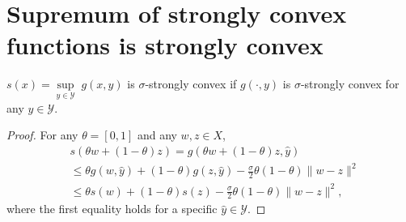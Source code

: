 \documentclass[pmlr]{jmlr} %
\def\reals{\mathbb{R}}
\def\reals{\mathbb{R}}
\def\K{\mathcal{K}}
\def\argmax{\mathop{\arg\max}}
\newcommand{\norm}[1]{\left\lVert#1\right\rVert}
\newcommand{\YY}{\mathcal{Y}}
\begin{document}
\section{Supremum of strongly convex functions is strongly convex}

\begin{lemma} \label{mysc}
$s(x) = \underset{y \in \YY}{\sup}\; g(x,y)$ is $\sigma$-strongly convex if $g(\cdot,y)$ is $\sigma$-strongly convex for any $y \in \YY$.
\end{lemma}

\begin{proof}
For any $\theta=[0,1]$ and any $w,z \in X$,
\begin{equation}
\begin{aligned}
& s(\theta w + (1-\theta) z ) = g( \theta w + (1-\theta) z , \hat{y} )
\\ &\leq \theta g(w, \hat{y}) +  (1-\theta) g(z, \hat{y}) - \frac{\sigma}{2} \theta (1 -\theta) \| w -z \|^{2}
\\ &\leq \theta s(w) + (1-\theta) s(z) - \frac{\sigma}{2} \theta (1 -\theta) \| w -z \|^{2},
\end{aligned}
\end{equation}
where the first equality holds for a specific $\hat{y} \in \YY$.

\end{proof}


\begin{comment}

\section{Another definition of strongly convex sets} \label{app:scset}

    It is shown in Proposition A.1 of~(\cite{HLGS16}) that an $\lambda$-strongly convex set
    can be expressed as the intersection of infinitely many Euclidean balls.  Denote that
    the $d$ dimensional unit sphere
    ${\mathcal{S} = \left\{ u \in \reals^{d} : \norm{u}^{2} = 1 \right\}}$
    and write $x_{u} = \underset{x \in \K}{\argmax} \left\langle x, u \right\rangle$
    for some $u \in \mathcal{S}$. A $\lambda$-strongly convex set $\K$ can be written as
    \[ \K = \underset{u \in \mathcal{S}}{\cap} B_{\frac{1}{\lambda}} \left( x_{u} - \frac{u}{\lambda} \right) ,\]
    where $B_{\frac{1}{\lambda}} \left( x_{u} - \frac{u}{\lambda} \right)$ represents
    a ball centered at $x_{u} - \frac{u}{\lambda}$ with radius of $\frac{1}{\lambda}$ in L2 norm.
\end{comment}
\end{document}
